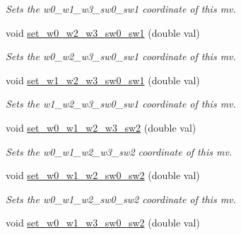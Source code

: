 \begin{DoxyCompactItemize}
\begin{DoxyCompactList}\small\item\em Sets the w0\-\_\-w1\-\_\-w3\-\_\-sw0\-\_\-sw1 coordinate of this mv. \end{DoxyCompactList}\item 
\hypertarget{classe3ga_1_1mv_ac21706459e8094cd79987e7850d61367}{void \hyperlink{classe3ga_1_1mv_ac21706459e8094cd79987e7850d61367}{set\-\_\-w0\-\_\-w2\-\_\-w3\-\_\-sw0\-\_\-sw1} (double val)}\label{classe3ga_1_1mv_ac21706459e8094cd79987e7850d61367}

\begin{DoxyCompactList}\small\item\em Sets the w0\-\_\-w2\-\_\-w3\-\_\-sw0\-\_\-sw1 coordinate of this mv. \end{DoxyCompactList}\item 
\hypertarget{classe3ga_1_1mv_aa8eba833f1dfad72ca5e54eedd918a00}{void \hyperlink{classe3ga_1_1mv_aa8eba833f1dfad72ca5e54eedd918a00}{set\-\_\-w1\-\_\-w2\-\_\-w3\-\_\-sw0\-\_\-sw1} (double val)}\label{classe3ga_1_1mv_aa8eba833f1dfad72ca5e54eedd918a00}

\begin{DoxyCompactList}\small\item\em Sets the w1\-\_\-w2\-\_\-w3\-\_\-sw0\-\_\-sw1 coordinate of this mv. \end{DoxyCompactList}\item 
\hypertarget{classe3ga_1_1mv_ac271fc6c5da8ef3e15637de1ef8c3465}{void \hyperlink{classe3ga_1_1mv_ac271fc6c5da8ef3e15637de1ef8c3465}{set\-\_\-w0\-\_\-w1\-\_\-w2\-\_\-w3\-\_\-sw2} (double val)}\label{classe3ga_1_1mv_ac271fc6c5da8ef3e15637de1ef8c3465}

\begin{DoxyCompactList}\small\item\em Sets the w0\-\_\-w1\-\_\-w2\-\_\-w3\-\_\-sw2 coordinate of this mv. \end{DoxyCompactList}\item 
\hypertarget{classe3ga_1_1mv_a3135dfeabf83c571ce8ddabb97dc9bd9}{void \hyperlink{classe3ga_1_1mv_a3135dfeabf83c571ce8ddabb97dc9bd9}{set\-\_\-w0\-\_\-w1\-\_\-w2\-\_\-sw0\-\_\-sw2} (double val)}\label{classe3ga_1_1mv_a3135dfeabf83c571ce8ddabb97dc9bd9}

\begin{DoxyCompactList}\small\item\em Sets the w0\-\_\-w1\-\_\-w2\-\_\-sw0\-\_\-sw2 coordinate of this mv. \end{DoxyCompactList}\item 
\hypertarget{classe3ga_1_1mv_a5a6a360dd35fadef05664ec7c3ec39b5}{void \hyperlink{classe3ga_1_1mv_a5a6a360dd35fadef05664ec7c3ec39b5}{set\-\_\-w0\-\_\-w1\-\_\-w3\-\_\-sw0\-\_\-sw2} (double val)}\label{classe3ga_1_1mv_a5a6a360dd35fadef05664ec7c3ec39b5}


\end{DoxyCompactItemize}
